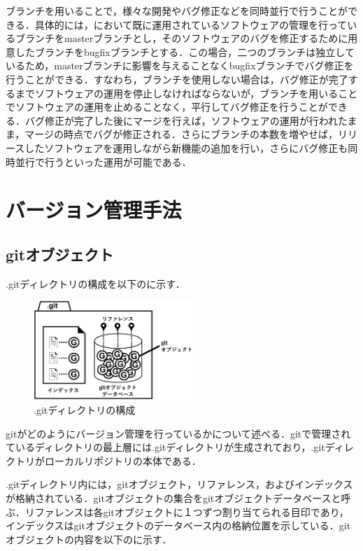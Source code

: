 \documentclass[a4j,9pt,twocolumn]{jsarticle}
\begin{document}
ブランチを用いることで，様々な開発やバグ修正などを同時並行で行うことができる．具体的には，において既に運用されているソフトウェアの管理を行っているブランチをmasterブランチとし，そのソフトウェアのバグを修正するために用意したブランチをbugfixブランチとする．この場合，二つのブランチは独立しているため，masterブランチに影響を与えることなくbugfixブランチでバグ修正を行うことができる．すなわち，ブランチを使用しない場合は，バグ修正が完了するまでソフトウェアの運用を停止しなければならないが，ブランチを用いることでソフトウェアの運用を止めることなく，平行してバグ修正を行うことができる．バグ修正が完了した後にマージを行えば，ソフトウェアの運用が行われたまま，マージの時点でバグが修正される．さらにブランチの本数を増やせば，リリースしたソフトウェアを運用しながら新機能の追加を行い，さらにバグ修正も同時並行で行うといった運用が可能である．

\section{バージョン管理手法}
\subsection{gitオブジェクト}
.gitディレクトリの構成を以下のに示す．

\begin{figure}[h]
\centering
\includegraphics[width=60mm]{img/git_obj.eps}
\caption{.gitディレクトリの構成}
\label{object1}
\end{figure}

gitがどのようにバージョン管理を行っているかについて述べる．gitで管理されているディレクトリの最上層には.gitディレクトリが生成されており，.gitディレクトリがローカルリポジトリの本体である．

.gitディレクトリ内には，gitオブジェクト，リファレンス，およびインデックスが格納されている．gitオブジェクトの集合をgitオブジェクトデータベースと呼ぶ．リファレンスは各gitオブジェクトに１つずつ割り当てられる目印であり，インデックスはgitオブジェクトのデータベース内の格納位置を示している．gitオブジェクトの内容を以下のに示す．
\end{document}
